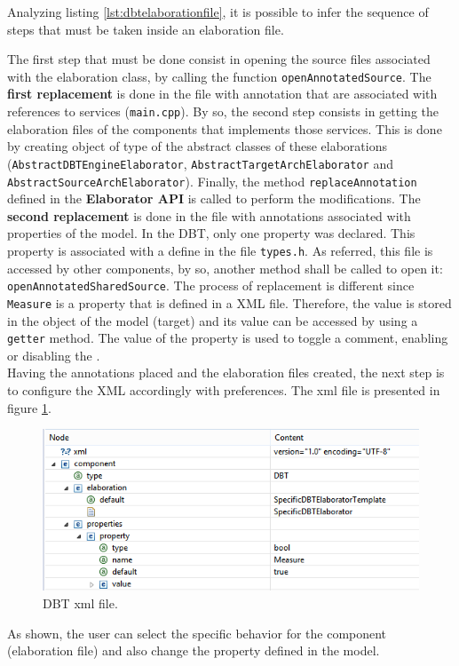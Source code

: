 Analyzing listing \ref{lst:dbtelaborationfile}, it is possible to infer the sequence of steps that must be taken inside an elaboration file.

The first step that must be done consist in opening the source files associated with the elaboration class, by calling the function \texttt{openAnnotatedSource}. The \textbf{first replacement} is done in the file with annotation that are associated with references to services (\texttt{main.cpp}). By so, the second step consists in getting the elaboration files of the components that implements those services. This is done by creating object of type of the abstract classes of these elaborations (\texttt{AbstractDBTEngineElaborator}, \texttt{AbstractTargetArchElaborator} and \texttt{AbstractSourceArchElaborator}). Finally, the method \texttt{replaceAnnotation} defined in the\textbf{ Elaborator API} is called to perform the modifications. The \textbf{second replacement} is done in the file with annotations associated with properties of the model. In the DBT, only one property was declared. This property is associated with a define in the file \texttt{types.h}. As referred, this file is accessed by other components, by so, another method shall be called to open it: \texttt{openAnnotatedSharedSource}. The process of replacement is different since \texttt{Measure} is a property that is defined in a XML file. Therefore, the value is stored in the object of the model (target) and its value can be accessed by using a \texttt{getter} method. The value of the property is used to toggle a comment, enabling or disabling the .  \\ 

Having the annotations placed and the elaboration files created, the next step is to configure the XML accordingly with preferences. The xml file is presented in figure \ref{fig:dbt_xml}.

\begin{figure}[H]
\centerline{
\includegraphics[scale=0.6]{images/mainxml}
}
\caption{DBT xml file.}
\label{fig:dbt_xml} 
\end{figure}

As shown, the user can select the specific behavior for the component (elaboration file) and also change the property defined in the model.




